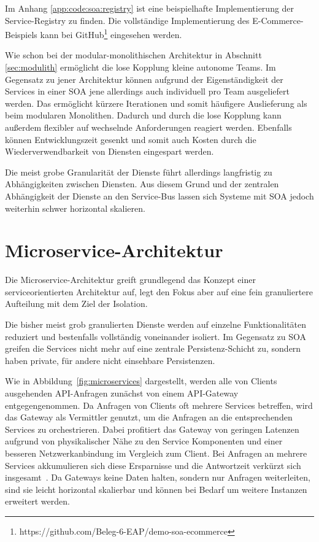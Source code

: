 \documentclass[acmtog]{acmart}
\begin{document}
Im Anhang \ref{app:code:soa:registry} ist eine beispielhafte Implementierung der Service-Registry zu finden.
Die vollständige Implementierung des E-Commerce-Beispiels kann bei GitHub\footnote{https://github.com/Beleg-6-EAP/demo-soa-ecommerce} eingesehen werden.

Wie schon bei der modular-monolithischen Architektur in Abschnitt \ref{sec:modulith} ermöglicht die lose Kopplung kleine autonome Teams.
Im Gegensatz zu jener Architektur können aufgrund der Eigenständigkeit der Services in einer SOA jene allerdings auch individuell pro Team ausgeliefert werden.
Das ermöglicht kürzere Iterationen und somit häufigere Auslieferung als beim modularen Monolithen.
Dadurch und durch die lose Kopplung kann außerdem flexibler auf wechselnde Anforderungen reagiert werden.
Ebenfalls können Entwicklungszeit gesenkt und somit auch Kosten durch die Wiederverwendbarkeit von Diensten eingespart werden.

Die meist grobe Granularität der Dienste führt allerdings langfristig zu Abhängigkeiten zwischen Diensten.
Aus diesem Grund und der zentralen Abhängigkeit der Dienste an den Service-Bus lassen sich Systeme mit SOA jedoch weiterhin schwer horizontal skalieren.

\section{Microservice-Architektur}
\label{sec:microservices}
Die Microservice-Architektur greift grundlegend das Konzept einer serviceorientierten Architektur auf, legt den Fokus aber auf eine fein granuliertere Aufteilung mit dem Ziel der Isolation.

Die bisher meist grob granulierten Dienste werden auf einzelne Funktionalitäten reduziert und bestenfalls vollständig voneinander isoliert.
Im Gegensatz zu SOA greifen die Services nicht mehr auf eine zentrale Persistenz-Schicht zu, sondern haben private, für andere nicht einsehbare Persistenzen\cite[2]{microservicesArchitecture}.

Wie in Abbildung~\ref{fig:microservices} dargestellt, werden alle von Clients ausgehenden API-Anfragen zunächst von einem API-Gateway entgegengenommen.
Da Anfragen von Clients oft mehrere Services betreffen, wird das Gateway als Vermittler genutzt, um die Anfragen an die entsprechenden Services zu orchestrieren.
Dabei profitiert das Gateway von geringen Latenzen aufgrund von physikalischer Nähe zu den Service Komponenten und einer besseren Netzwerkanbindung im Vergleich zum Client.
Bei Anfragen an mehrere Services akkumulieren sich diese Ersparnisse und die Antwortzeit verkürzt sich insgesamt~\cite[30]{architecturePatterns}.
Da Gateways keine Daten halten, sondern nur Anfragen weiterleiten, sind sie leicht horizontal skalierbar und können bei Bedarf um weitere Instanzen erweitert werden.
\end{document}
